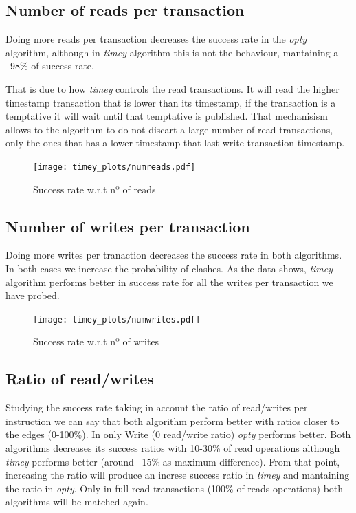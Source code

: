 \documentclass[a4paper, 10pt]{article}
\begin{document}
\clearpage
\subsection{Number of reads per transaction}

Doing more reads per transaction decreases the success rate in the \textit{opty} algorithm, although in \textit{timey} algorithm this is not the behaviour, mantaining a ~98\% of success rate.

That is due to how \textit{timey} controls the read transactions. It will read the higher timestamp transaction that is lower than its timestamp, if the transaction is a temptative it will wait until that temptative is published. That mechanisism allows to the algorithm to do not discart a large number of read transactions, only the ones that has a lower timestamp that last write transaction timestamp.

\begin{figure}[H]
  \centering
  \texttt{[image: timey\_plots/numreads.pdf]}
    \caption{Success rate w.r.t nº of reads}
    \label{timey:numreads}
\end{figure} 

\clearpage
\subsection{Number of writes per transaction}

Doing more writes per tranaction decreases the success rate in both algorithms. In both cases we increase the probability of clashes. As the data shows, \textit{timey} algorithm performs better in success rate for all the writes per transaction we have probed.

\begin{figure}[H]
  \centering
  \texttt{[image: timey\_plots/numwrites.pdf]}
    \caption{Success rate w.r.t nº of writes}
    \label{timey:numwrites}
\end{figure} 

\clearpage
\subsection{Ratio of read/writes}

Studying the success rate taking in account the ratio of read/writes per instruction we can say that both algorithm perform better with ratios closer to the edges (0-100\%). In only Write (0 read/write ratio) \textit{opty} performs better. Both algorithms decreases its success ratios with 10-30\% of read operations although \textit{timey} performs better (around ~15\% as maximum difference). From that point, increasing the ratio will produce an increse success ratio in \textit{timey} and mantaining the ratio in \textit{opty}. Only in full read transactions (100\% of reads operations) both algorithms will be matched again.
\end{document}
